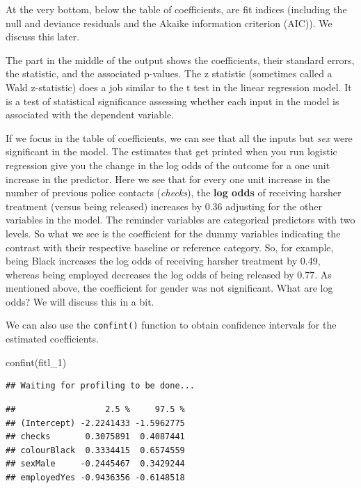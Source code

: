 \documentclass[
]{book}
\newenvironment{Shaded}{\begin{snugshade}}{\end{snugshade}}
\newcommand{\FunctionTok}[1]{\textcolor[rgb]{0.00,0.00,0.00}{#1}}
\newcommand{\NormalTok}[1]{#1}
\begin{document}
At the very bottom, below the table of coefficients, are fit indices (including the null and deviance residuals and the Akaike information criterion (AIC)). We discuss this later.

The part in the middle of the output shows the coefficients, their standard errors, the statistic, and the associated p-values. The z statistic (sometimes called a Wald z-statistic) does a job similar to the t test in the linear regression model. It is a test of statistical significance assessing whether each input in the model is associated with the dependent variable.

If we focus in the table of coefficients, we can see that all the inputs but \emph{sex} were significant in the model. The estimates that get printed when you run logistic regression give you the change in the log odds of the outcome for a one unit increase in the predictor. Here we see that for every one unit increase in the number of previous police contacts (\emph{checks}), the \textbf{log odds} of receiving harsher treatment (versus being released) increases by 0.36 adjusting for the other variables in the model. The reminder variables are categorical predictors with two levels. So what we see is the coefficient for the dummy variables indicating the contrast with their respective baseline or reference category. So, for example, being Black increases the log odds of receiving harsher treatment by 0.49, whereas being employed decreases the log odds of being released by 0.77. As mentioned above, the coefficient for gender was not significant. What are log odds? We will discuss this in a bit.

We can also use the \texttt{confint()} function to obtain confidence intervals for the estimated coefficients.

\begin{Shaded}
\begin{Highlighting}[]
\FunctionTok{confint}\NormalTok{(fitl\_1)}
\end{Highlighting}
\end{Shaded}

\begin{verbatim}
## Waiting for profiling to be done...
\end{verbatim}

\begin{verbatim}
##                  2.5 %     97.5 %
## (Intercept) -2.2241433 -1.5962775
## checks       0.3075891  0.4087441
## colourBlack  0.3334415  0.6574559
## sexMale     -0.2445467  0.3429244
## employedYes -0.9436356 -0.6148518
\end{verbatim}
\end{document}
